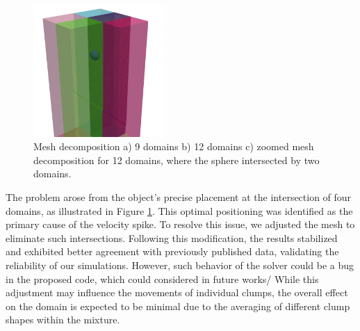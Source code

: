 \begin{figure}[!htp]
\begin{minipage}{7cm}
\subcaption{}
\end{minipage}
\newline
\begin{minipage}{7cm}
\includegraphics[width=5cm]{GWU_Thesis_Sarmakeeva/Images/chap3/decomp12_zoom.png}
\subcaption{}
\end{minipage}
\caption{Mesh decomposition a) 9 domains b) 12 domains c) zoomed mesh decomposition for 12 domains, where the sphere intersected by two domains.}
\label{decompositopn}
\end{figure}

The problem arose from the object's precise placement at the intersection of four domains, as illustrated in Figure \ref{decompositopn}. This optimal positioning was identified as the primary cause of the velocity spike. To resolve this issue, we adjusted the mesh to eliminate such intersections. Following this modification, the results stabilized and exhibited better agreement with previously published data, validating the reliability of our simulations. However, such behavior of the solver could be a bug in the proposed code, which could considered in future works/ While this adjustment may influence the movements of individual clumps, the overall effect on the domain is expected to be minimal due to the averaging of different clump shapes within the mixture.





